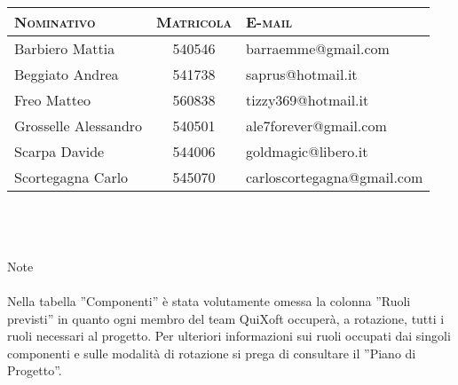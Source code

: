 \documentclass[11pt,a4paper]{article}
\begin{document}
\normalsize
\begin{tabular}{|p{}|c|p{}|}
\hline
\textsc{Nominativo} & \textsc{Matricola} & \textsc{E-mail} \\
\hline
\hline
Barbiero Mattia & 540546 & barraemme@gmail.com \\
\hline
Beggiato Andrea & 541738 & saprus@hotmail.it \\
\hline
Freo Matteo & 560838 & tizzy369@hotmail.it \\
\hline
Grosselle Alessandro & 540501 & ale7forever@gmail.com \\
\hline
Scarpa Davide & 544006 & goldmagic@libero.it \\
\hline
Scortegagna Carlo & 545070 & carloscortegagna@gmail.com \\
\hline
\end{tabular} \\ \\ \\
\Large Note \\ \\
\normalsize
Nella tabella ''Componenti'' è stata volutamente omessa la colonna ''Ruoli previsti'' in quanto ogni membro del team QuiXoft occuperà, a rotazione, tutti i ruoli necessari al progetto. Per ulteriori informazioni sui ruoli occupati dai singoli componenti e sulle modalità di rotazione si prega di consultare il ''Piano di Progetto''.
\end{document}
